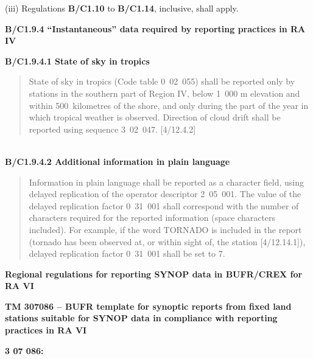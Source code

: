 (iii) Regulations \textbf{B/C1.10} to \textbf{B/C1.14}, inclusive, shall apply.

\textbf{B/C1.9.4 ``Instantaneous'' data required by reporting practices in RA IV}

\textbf{B/C1.9.4.1 State of sky in tropics}

\begin{quote}
State of sky in tropics (Code table 0~02~055) shall be reported only by stations in the southern part of Region IV, below 1~000 m elevation and within 500~kilometres of the shore, and only during the part of the year in which tropical weather is observed. Direction of cloud drift shall be reported using sequence 3~02~047. {[}4/12.4.2{]}
\end{quote}

\textbf{\\
B/C1.9.4.2 Additional information in plain language}

\begin{quote}
Information in plain language shall be reported as a character field, using delayed replication of the operator descriptor 2~05~001. The value of the delayed replication factor 0~31~001 shall correspond with the number of characters required for the reported information (space characters included). For example, if the word TORNADO is included in the report (tornado has been observed at, or within sight of, the station {[}4/12.14.1{]}), delayed replication factor 0~31~001 shall be set to 7.
\end{quote}

\textbf{Regional regulations for reporting SYNOP data in BUFR/CREX for RA VI}

\textbf{TM 307086 -- BUFR template for synoptic reports from fixed land stations suitable for SYNOP data in compliance with reporting practices in RA VI}

\textbf{3 07 086:}

